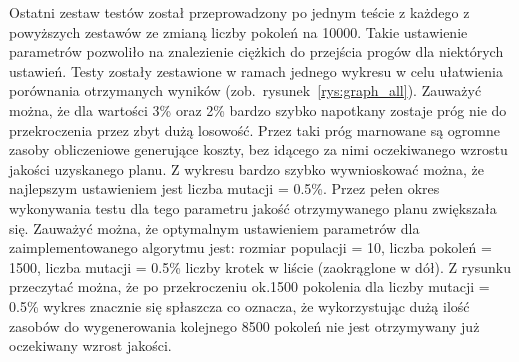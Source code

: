 	Ostatni zestaw testów został przeprowadzony po jednym teście z każdego z powyższych zestawów ze zmianą liczby pokoleń na 10000. Takie ustawienie parametrów pozwoliło na znalezienie ciężkich do przejścia progów dla niektórych ustawień. Testy zostały zestawione w ramach jednego wykresu w celu ułatwienia porównania otrzymanych wyników (zob.~rysunek~\ref{rys:graph_all}). Zauważyć można, że dla wartości 3\% oraz 2\% bardzo szybko napotkany zostaje próg nie do przekroczenia przez zbyt dużą losowość. Przez taki próg marnowane są ogromne zasoby obliczeniowe generujące koszty, bez idącego za nimi oczekiwanego wzrostu jakości uzyskanego planu. Z wykresu bardzo szybko wywnioskować można, że najlepszym ustawieniem jest liczba mutacji = 0.5\%. Przez pełen okres wykonywania testu dla tego parametru jakość otrzymywanego planu zwiększała się. Zauważyć można, że optymalnym ustawieniem parametrów dla zaimplementowanego algorytmu jest: rozmiar populacji = 10, liczba pokoleń = 1500, liczba mutacji = 0.5\% liczby krotek w liście (zaokrąglone w dół). Z rysunku przeczytać można, że po przekroczeniu ok.1500 pokolenia dla liczby mutacji = 0.5\% wykres znacznie się spłaszcza co oznacza, że wykorzystując dużą ilość zasobów do wygenerowania kolejnego 8500 pokoleń nie jest otrzymywany już oczekiwany wzrost jakości.

